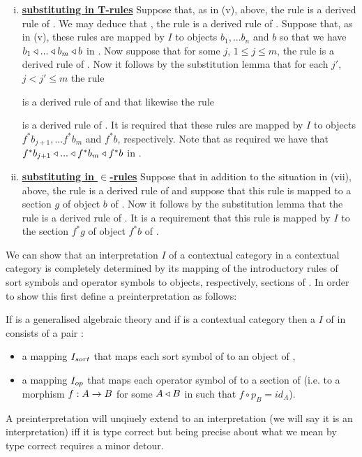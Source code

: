 \begin{enumerate}[(i)]
\item \underline{\textbf{substituting in T-rules}} 
Suppose that, as in (v), above, the rule 
 is a derived rule of \gatU.
We may deduce that \foreachj, the rule    is a derived rule of \gatU. 
Suppose that, as in (v), these rules are mapped by $I$ to objects $b_1,...b_n$ and $b$ so that
we have  $b_1 \triangleleft ... \triangleleft b_m \triangleleft b$ in \catc. Now suppose that for some $j$, $1 \leq j \leq m$, the rule
 is a derived rule of \gatU. 
Now it follows by the substitution lemma that for each $j'$, $j < j' \leq m$ the rule

 is a derived rule of \gatUw and that likewise the rule

 is a derived rule of \gatU.
It is required that these rules are mapped by $I$ to objects $f^*b_{j+1},...f^*b_m$ and $f^*b$, respectively.
Note that as required we have that $f^*b_{j+1}\triangleleft ... \triangleleft f^*b_m \triangleleft f^*b$ in \catc.

\item \underline{\textbf{substituting in $\boldsymbol {\in}$-rules}} 
Suppose that in addition to the situation in (vii), above, the rule
is a derived rule of \gatUw and suppose that this rule is mapped to a section $g$ of object $b$ of \catc.
Now it follows by the substitution lemma that the rule
is a derived rule of \gatU.
It is a requirement that this rule is mapped by $I$ to the section $f^*g$ of object $f^*b$ of \catc.
\end{enumerate}


\note
We can show that an interpretation $I$ of a contextual category \gatUw in a contextual category \catCw is
completely determined by its mapping of the introductory rules of sort symbols and operator symbols to
objects, respectively, sections of \catc. In order to show this first define a preinterpretation as follows:
\begin{definition}
If \gatU is a generalised algebraic theory  and if \catcw is a contextual category then
a  $I$ of  \gatU in \catcw consists of a pair :
\begin{itemize}
\item a mapping $I_{sort}$ that maps each sort symbol of \gatUw to  an object of \catc,
\item a mapping $I_{op}$ that maps each operator symbol of \gatUw to a section of \catcw (i.e. to a morphism $f: A \rightarrow B$ for some 
$A \triangleleft B$ in \catcw such that $f \circ p_B=id_A$).
\end{itemize}
\end{definition}
A preinterpretation will unqiuely extend to an interpretation (we will say it is an interpretation) iff it is type correct but being precise about what we mean by type correct requires a minor detour. 

